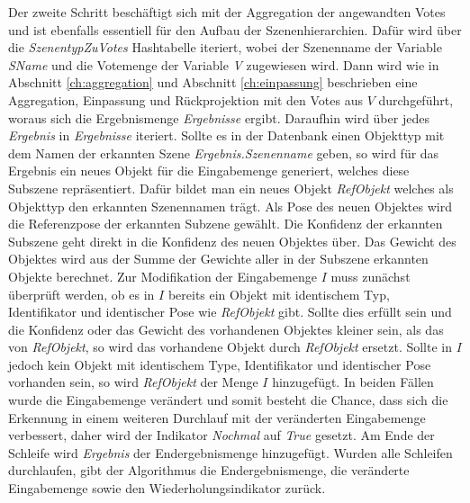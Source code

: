 Der zweite Schritt beschäftigt sich mit der Aggregation der angewandten Votes und ist ebenfalls essentiell für den Aufbau der Szenenhierarchien.
Dafür wird über die \textit{SzenentypZuVotes} Hashtabelle iteriert, wobei der Szenenname der Variable \textit{SName} und die Votemenge der Variable \textit{V} zugewiesen wird.
Dann wird wie in Abschnitt \vref{ch:aggregation} und Abschnitt \vref{ch:einpassung} beschrieben eine Aggregation, Einpassung und Rückprojektion mit den Votes aus $V$ durchgeführt, woraus sich die Ergebnismenge \textit{Ergebnisse} ergibt.
Daraufhin wird über jedes \textit{Ergebnis} in \textit{Ergebnisse} iteriert.
Sollte es in der Datenbank einen Objekttyp mit dem Namen der erkannten Szene \textit{Ergebnis.Szenenname} geben, so wird für das Ergebnis ein neues Objekt für die Eingabemenge generiert, welches diese Subszene repräsentiert.
Dafür bildet man ein neues Objekt \textit{RefObjekt} welches als Objekttyp den erkannten Szenennamen trägt.
Als Pose des neuen Objektes wird die Referenzpose der erkannten Subzene gewählt.
Die Konfidenz der erkannten Subszene geht direkt in die Konfidenz des neuen Objektes über.
Das Gewicht des Objektes wird aus der Summe der Gewichte aller in der Subszene erkannten Objekte berechnet.
Zur Modifikation der Eingabemenge $I$ muss zunächst überprüft werden, ob es in $I$ bereits ein Objekt mit identischem Typ, Identifikator und identischer Pose wie \textit{RefObjekt} gibt.
Sollte dies erfüllt sein und die Konfidenz oder das Gewicht des vorhandenen Objektes kleiner sein, als das von \textit{RefObjekt}, so wird das vorhandene Objekt durch \textit{RefObjekt} ersetzt.
Sollte in $I$ jedoch kein Objekt mit identischem Type, Identifikator und identischer Pose vorhanden sein, so wird \textit{RefObjekt} der Menge $I$ hinzugefügt.
In beiden Fällen wurde die Eingabemenge verändert und somit besteht die Chance, dass sich die Erkennung in einem weiteren Durchlauf mit der veränderten Eingabemenge verbessert, daher wird der Indikator \textit{Nochmal} auf \textit{True} gesetzt.
Am Ende der Schleife wird \textit{Ergebnis} der Endergebnismenge hinzugefügt.
Wurden alle Schleifen durchlaufen, gibt der Algorithmus die Endergebnismenge, die veränderte Eingabemenge sowie den Wiederholungsindikator zurück.

